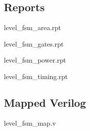 \documentclass[11pt]{article}
\begin{document}
\subsection{Reports}
level{\_}fsm{\_}area.rpt

level{\_}fsm{\_}gates.rpt

level{\_}fsm{\_}power.rpt

level{\_}fsm{\_}timing.rpt

\subsection{Mapped Verilog}
level{\_}fsm{\_}map.v

\end{document}
